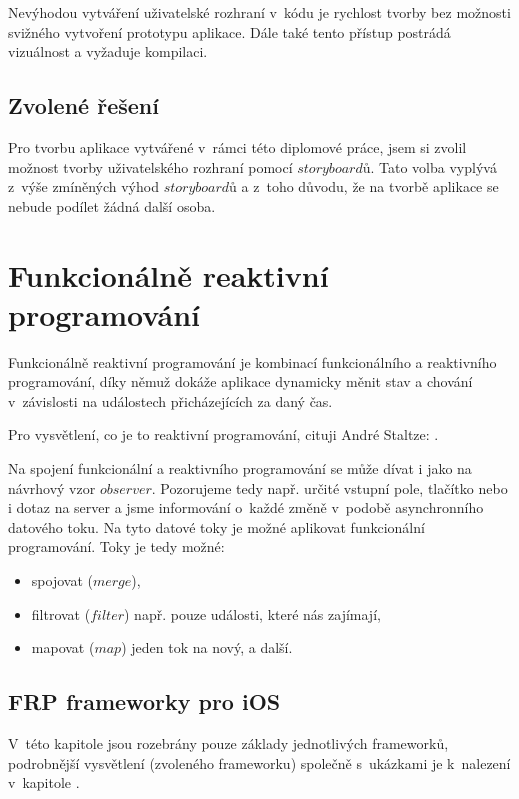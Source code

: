 \documentclass[thesis=M,czech]{FITthesis}[2012/06/26]
\begin{document}
Nevýhodou vytváření uživatelské rozhraní v~kódu je rychlost tvorby bez možnosti svižného vytvoření prototypu aplikace. Dále také tento přístup postrádá vizuálnost a vyžaduje kompilaci. \cite{iOSUI} \cite{dominik}

\subsection{Zvolené řešení}
Pro tvorbu aplikace vytvářené v~rámci této diplomové práce, jsem si zvolil možnost tvorby uživatelského rozhraní pomocí $storyboardů$. Tato volba vyplývá z~výše zmíněných výhod $storyboardů$ a z~toho důvodu, že na tvorbě aplikace se nebude podílet žádná další osoba.

\section{Funkcionálně reaktivní programování}
Funkcionálně reaktivní programování je kombinací funkcionálního a reaktivního programování, díky němuž dokáže aplikace dynamicky měnit stav a chování v~závislosti na událostech přicházejících za daný čas. \cite{nayebi2016swift}

Pro vysvětlení, co je to reaktivní programování, cituji André Staltze: . \cite{Ztaltz2014}

Na spojení funkcionální a reaktivního programování se může dívat i jako na návrhový vzor $observer$. \cite{Blackheath2016} Pozorujeme tedy např. určité vstupní pole, tlačítko nebo i dotaz na server a jsme informování o~každé změně v~podobě asynchronního datového toku. Na tyto datové toky je možné aplikovat funkcionální programování. Toky je tedy možné:
\begin{itemize}
\item spojovat ($merge$),
\item filtrovat ($filter$) např. pouze události, které nás zajímají,
\item mapovat ($map$) jeden tok na nový, a další. \cite{Ztaltz2014}
\end{itemize}

\subsection{FRP frameworky pro iOS}
V~této kapitole jsou rozebrány pouze základy jednotlivých frameworků, podrobnější vysvětlení (zvoleného frameworku) společně s~ukázkami je k~nalezení v~kapitole .
\end{document}
